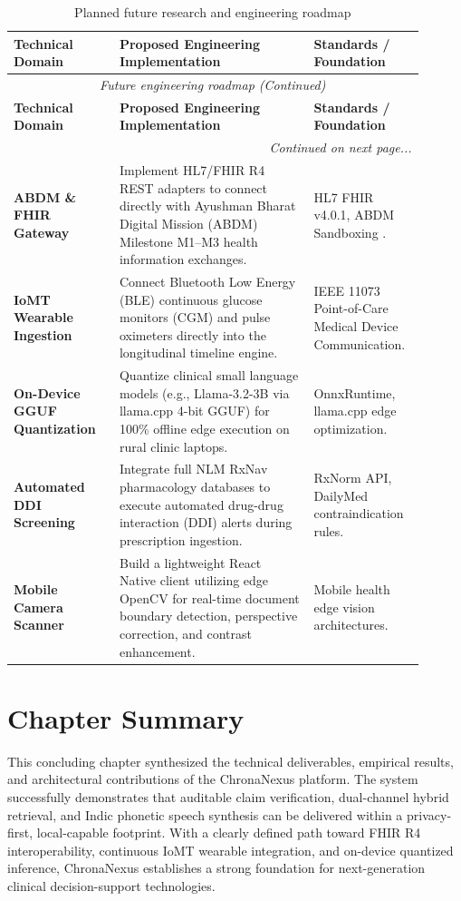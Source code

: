 \small
\begin{longtable}{@{}p{0.24\linewidth} p{0.44\linewidth} p{0.22\linewidth}@{}}
\caption{Planned future research and engineering roadmap}\label{tab:10_1_future} \\
\toprule
\textbf{Technical Domain} & \textbf{Proposed Engineering Implementation} & \textbf{Standards / Foundation} \\
\midrule
\endfirsthead
\toprule
\multicolumn{3}{c}{\small\textit{Future engineering roadmap (Continued)}} \\[4pt]
\midrule
\textbf{Technical Domain} & \textbf{Proposed Engineering Implementation} & \textbf{Standards / Foundation} \\
\midrule
\endhead
\midrule
\multicolumn{3}{r}{\footnotesize\textit{Continued on next page...}} \\
\bottomrule
\endfoot
\bottomrule
\endlastfoot
\textbf{ABDM \& FHIR Gateway} & Implement HL7/FHIR R4 REST adapters to connect directly with Ayushman Bharat Digital Mission (ABDM) Milestone M1--M3 health information exchanges. & HL7 FHIR v4.0.1, ABDM Sandboxing \cite{nha2022abdm}. \\
\textbf{IoMT Wearable Ingestion} & Connect Bluetooth Low Energy (BLE) continuous glucose monitors (CGM) and pulse oximeters directly into the longitudinal timeline engine. & IEEE 11073 Point-of-Care Medical Device Communication. \\
\textbf{On-Device GGUF Quantization} & Quantize clinical small language models (e.g., Llama-3.2-3B via llama.cpp 4-bit GGUF) for 100\% offline edge execution on rural clinic laptops. & OnnxRuntime, llama.cpp edge optimization. \\
\textbf{Automated DDI Screening} & Integrate full NLM RxNav pharmacology databases to execute automated drug-drug interaction (DDI) alerts during prescription ingestion. & RxNorm API, DailyMed contraindication rules. \\
\textbf{Mobile Camera Scanner} & Build a lightweight React Native client utilizing edge OpenCV for real-time document boundary detection, perspective correction, and contrast enhancement. & Mobile health edge vision architectures. \\
\bottomrule
\end{longtable}
\normalsize


\section{Chapter Summary}

This concluding chapter synthesized the technical deliverables, empirical results, and architectural contributions of the ChronaNexus platform. The system successfully demonstrates that auditable claim verification, dual-channel hybrid retrieval, and Indic phonetic speech synthesis can be delivered within a privacy-first, local-capable footprint. With a clearly defined path toward FHIR R4 interoperability, continuous IoMT wearable integration, and on-device quantized inference, ChronaNexus establishes a strong foundation for next-generation clinical decision-support technologies.
